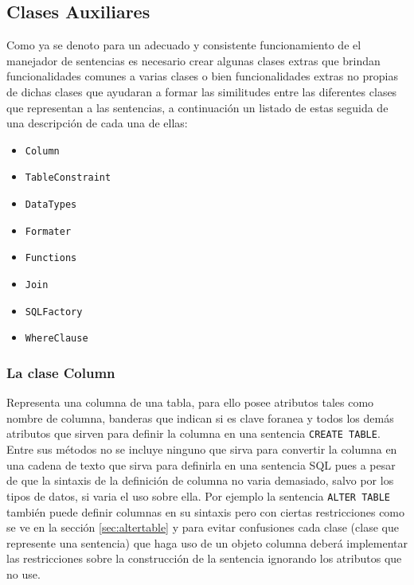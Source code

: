 \subsection{Clases Auxiliares} \label{seccion:disenio:clases-auxiliares}
Como ya se denoto para un adecuado y consistente funcionamiento de el manejador de sentencias es necesario crear algunas clases extras que brindan funcionalidades comunes a varias clases o bien funcionalidades extras no propias de dichas clases que ayudaran a formar las similitudes entre las diferentes clases que representan a las sentencias, a continuación un listado de estas seguida de una descripción de cada una de ellas:
%
\begin{itemize}
\item \verb=Column=
\item \verb=TableConstraint=
\item \verb=DataTypes=
\item \verb=Formater=
\item \verb=Functions=
\item \verb=Join=
\item \verb=SQLFactory=
\item \verb=WhereClause=
\end{itemize}
%
\subsubsection{La clase Column}
Representa una columna de una tabla, para ello posee atributos tales como nombre de columna, banderas que indican si es clave foranea y todos los demás atributos que sirven para definir la columna en una sentencia \verb=CREATE TABLE=. Entre sus métodos no se incluye ninguno que sirva para convertir la columna en una cadena  de texto que sirva para definirla en una sentencia SQL pues a pesar de que la sintaxis de la definición de columna no varia demasiado, salvo por los tipos de datos, si varia el uso sobre ella. Por ejemplo la sentencia \verb=ALTER TABLE= también puede definir columnas en su sintaxis pero con ciertas restricciones como se ve en la sección \ref{sec:altertable} y para evitar confusiones cada clase (clase que represente una sentencia) que haga uso de un objeto columna deberá implementar las restricciones sobre la construcción de la sentencia ignorando los atributos que no use.

